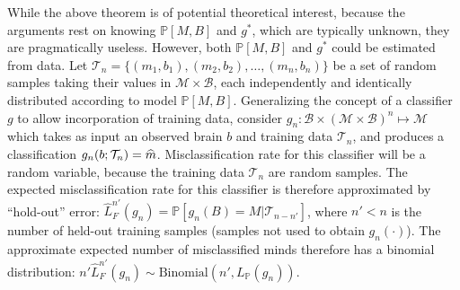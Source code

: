 \documentclass{article}
\newcommand{\mB}{\mathcal{B}}
\newcommand{\mM}{\mathcal{M}}
\newcommand{\PP}{\mathbb{P}}           %
\newcommand{\EE}{\mathbb{E}}           %
\providecommand{\mc}[1]{\mathcal{#1}}
\providecommand{\mh}[1]{\widehat{#1}}
\newcommand{\hL}{\widehat{L}}
\providecommand{\tr}[1]{\textcolor{black}{#1}}
\begin{document}
While the above theorem is of potential theoretical interest, because the arguments rest on knowing $\PP[M,B]$ and $g^*$, which are typically unknown, they are pragmatically useless.  However, both $\PP[M,B]$ and $g^*$ could be estimated from data.  Let $\mc{T}_n=\{(m_1,b_1), (m_2,b_2), \ldots, (m_n,b_n)\}$ be a set of random samples taking their values in $\mc{M} \times \mc{B}$, each independently and identically distributed according to model $\PP[M,B]$.  Generalizing the concept of a classifier $g$ to allow incorporation of training data, consider $g_n:\mB \times (\mc{M} \times \mc{B})^n \mapsto \mM$ which takes as input an observed brain  $b$ and training data $\mc{T}_n$, and produces a classification $g_n(b;\tr{\mc{T}_n})=\mh{m}$.  Misclassification rate for this classifier will be a random variable, because the training data $\mc{T}_n$ are random samples.  The expected misclassification rate for this classifier is therefore approximated by ``hold-out'' error:
$\hL^{n'}_{F}(g_n) = \PP[g_n(B)=M | \mc{T}_{n-n'}]$,
where $n'<n$ is the number of held-out training samples (samples not used to obtain $g_n(\cdot)$).
The approximate expected number of misclassified minds
therefore
has a binomial distribution:  $n' \hL^{n'}_{F}(g_n) \sim \text{Binomial}(n',L_{\PP}(g_n))$. %
\end{document}
